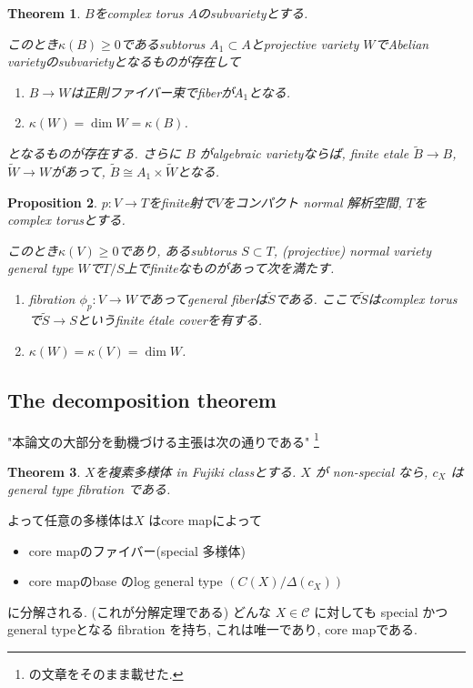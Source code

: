 \documentclass[dvipdfmx,a4paper,11pt]{article} %
\newtheorem{thm}{Theorem}[section]
\newtheorem{prop}[thm]{Proposition}
\theoremstyle{definition}
\theoremstyle{remark}
\numberwithin{equation}{section}
\begin{document}
\begin{thm} \cite[Theorem 10.9]{Uen75}
$B$をcomplex torus $A$のsubvarietyとする. 

このとき$\kappa(B) \ge 0$であるsubtorus $A_1 \subset A$とprojective
variety $W$でAbelian varietyのsubvarietyとなるものが存在して
\begin{enumerate}
\item $B \to W$は正則ファイバー束でfiberが$A_1$となる.
\item $\kappa(W)=\dim W=\kappa(B)$.
\end{enumerate}
となるものが存在する.
さらに $B$ がalgebraic varietyならば, finite etale $\tilde{B} \to B$, $\tilde{W} \to W$があって,  $\tilde{B} \cong A_1\times \tilde{W}$となる. 
\end{thm}

\begin{prop}\cite[Proposition 4.1]{Wang21}
$p : V \to T$をfinite射で$V$をコンパクト normal 解析空間, $T$をcomplex torusとする. 

このとき$\kappa(V) \geq 0$であり, あるsubtorus $S \subset T$, 
(projective) normal variety general type $W$で$T/S$上でfiniteなものがあって次を満たす. 
\begin{enumerate}
\item fibration $\phi_p : V \to W$であってgeneral fiberは$\tilde{S}$である.
ここで$\tilde{S}$はcomplex torusで$\tilde{S} \to S$というfinite
\'etale coverを有する.
\item $\kappa(W) = \kappa(V) = \dim W$.
\end{enumerate}
\end{prop}

\subsection{The decomposition theorem \cite[5.4]{Cam04}}
"本論文の大部分を動機づける主張は次の通りである" \footnote{\cite{Cam04}の文章をそのまま載せた. }

\begin{thm}\cite[Theorem 5.8]{Cam04}
\label{thm-Cam-4-5.8}
$X$を複素多様体 in Fujiki classとする.
\( X \) が non-special なら, \( c_X \) はgeneral type fibration である.
\end{thm}

よって任意の多様体は\( X \) はcore mapによって
\begin{itemize}
\item core mapのファイバー(special 多様体)
\item core mapのbase のlog general type $(C(X)/\Delta(c_X))$
\end{itemize}
に分解される. (これが分解定理である)
どんな \( X\in\mathcal{C} \) に対しても special かつgeneral typeとなる fibration を持ち, これは唯一であり, core mapである. 
\end{document}
